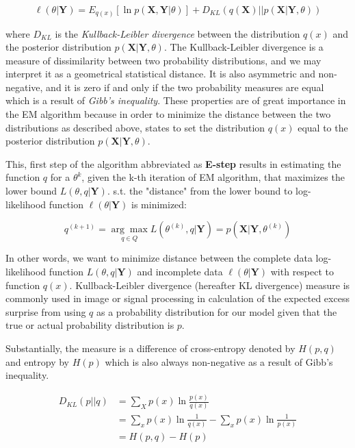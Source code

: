 \begin{equation}
    \ell(\theta|\textbf{Y}) = E_{q(x)} [\ln p(\textbf{X},\textbf{Y}|\theta)] + D_{KL} (q(\textbf{X}) || p(\textbf{X}| \textbf{Y},\theta))
\end{equation}

where $D_{KL}$ is the \textit{Kullback-Leibler divergence} between the distribution $q(x)$ and the posterior distribution $p(\textbf{X}|\textbf{Y},\theta)$.
The Kullback-Leibler divergence is a measure of dissimilarity between two probability distributions, and we may interpret it as a geometrical statistical distance.
It is also asymmetric and non-negative, and it is zero if and only if the two probability measures are equal which is a result of \textit{Gibb's inequality}. \citep{Csiszar1975}
These properties are of great importance in the EM algorithm because in order to minimize the distance between the two distributions as described above,
\citep{Bishop2006} states to set the distribution $q(x)$ equal to the posterior distribution $p(\textbf{X}|\textbf{Y},\theta)$.

This, first step of the algorithm abbreviated as \textbf{E-step} results in estimating the function $q$ for a $\theta^{k}$, given the k-th iteration of EM algorithm, 
that maximizes the lower bound $L(\theta,q|\textbf{Y})$. s.t. the "distance" from the lower bound to log-likelihood function $\ell(\theta|\textbf{Y})$ is minimized:

\begin{equation} \label{eq:qnew}
    q^{(k+1)} = \underset{q \in Q}{\arg\max} L(\theta^{(k)},q|\textbf{Y}) = p(\textbf{X}|\textbf{Y},\theta^{(k)})
\end{equation}

In other words, we want to minimize distance between the complete data log-likelihood function $L(\theta,q|\textbf{Y})$ and incomplete data $\ell(\theta|\textbf{Y})$ 
with respect to function $q(x)$. Kullback-Leibler divergence (hereafter KL divergence) measure is commonly used in image or signal processing 
in calculation of the expected excess surprise from using $q$ as a probability distribution for our model given that the true or actual 
probability distribution is $p$. \citep{Balesdent2016} 

Substantially, the measure is a difference of cross-entropy denoted by $H(p,q)$ and entropy by $H(p)$ which is also always non-negative as a result of Gibb's inequality.

\begin{align}
    D_{KL} (p || q) & = \sum_{X} p(x) \ln \frac{p(x)}{q(x)} \\
                    & = \sum_{x} p(x) \ln \frac{1}{q(x)} - \sum_{x} p(x) \ln \frac{1}{p(x)} \\
                    & = H(p,q) - H(p)
\end{align}

